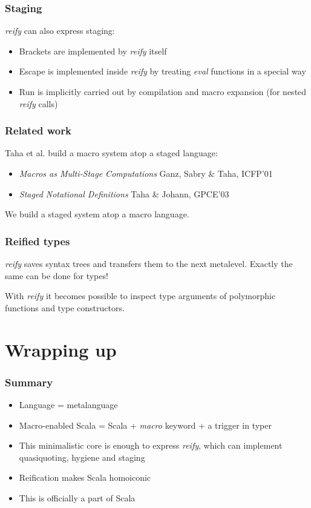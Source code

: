 \documentclass[hyperref={bookmarks=false}]{beamer}
\begin{document}
\begin{frame}[fragile]
\frametitle{Staging}

\emph{reify} can also express staging:

\begin{itemize}
\item Brackets are implemented by \emph{reify} itself \text{\color{red}{(what about lift?)}}
\item Escape is implemented inside \emph{reify} by treating \emph{eval} functions in a special way
\item Run is implicitly carried out by compilation and macro expansion (for nested \emph{reify} calls)
\end{itemize}

\end{frame}

\begin{frame}[fragile]
\frametitle{Related work}

Taha et al. build a macro system atop a staged language:
\begin{itemize}
\item \emph{Macros as Multi-Stage Computations} Ganz, Sabry \& Taha, ICFP'01
\item \emph{Staged Notational Definitions} Taha \& Johann, GPCE'03
\end{itemize}

We build a staged system atop a macro language.

\end{frame}

\begin{frame}[fragile]
\frametitle{Reified types}

\emph{reify} saves syntax trees and transfers them to the next metalevel. Exactly the same can be done for types!

With \emph{reify} it becomes possible to inspect type arguments of polymorphic functions and type constructors.
\end{frame}

\section{Wrapping up}

\begin{frame}[fragile]
\frametitle{Summary}

\begin{itemize}
\item Language = metalanguage
\item Macro-enabled Scala = Scala + \emph{macro} keyword + a trigger in typer
\item This minimalistic core is enough to express \emph{reify}, which can implement quasiquoting, hygiene and staging
\item Reification makes Scala homoiconic
\item This is officially a part of Scala
\end{itemize}
\end{frame}
\end{document}
